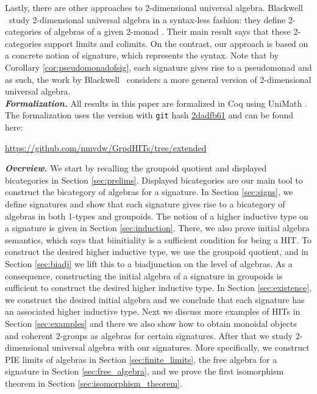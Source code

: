 Lastly, there are other approaches to 2-dimensional universal algebra.
Blackwell \etal \ study 2-dimensional universal algebra in a syntax-less fashion: they define 2-categories of algebras of a given 2-monad \cite{blackwell1989two}.
Their main result says that these 2-categories support limits and colimits.
On the contrast, our approach is based on a concrete notion of signature, which represents the syntax.
Note that by Corollary \ref{cor:pseudomonadofsig}, each signature gives rise to a pseudomonad and as such, the work by Blackwell \etal \ considers a more general version of 2-dimensional universal algebra.
\\
\emph{\textbf{Formalization.}}
All results in this paper are formalized in Coq \cite{Coq:manual} using UniMath \cite{UniMath}.
The formalization uses the version with \texttt{git} hash \href{https://github.com/UniMath/UniMath/tree/2dadfb61f5ef0d9805cf0eb6b80ef2beb26472d5}{2dadfb61} and can be found here:
\begin{center}
\url{https://github.com/nmvdw/GrpdHITs/tree/extended}
\end{center}
\emph{\textbf{Overview.}}
We start by recalling the groupoid quotient and displayed bicategories in Section \ref{sec:prelims}.
Displayed bicategories are our main tool to construct the bicategory of algebras for a signature.
In Section \ref{sec:signs}, we define signatures and show that each signature gives rise to a bicategory of algebras in both 1-types and groupoids.
The notion of a higher inductive type on a signature is given in Section \ref{sec:induction}.
There, we also prove initial algebra semantics, which says that biinitiality is a sufficient condition for being a HIT.
To construct the desired higher inductive type, we use the groupoid quotient, and in Section \ref{sec:biadj} we lift this to a biadjunction on the level of algebras.
As a consequence, constructing the initial algebra of a signature in groupoids is sufficient to construct the desired higher inductive type.
In Section \ref{sec:existence}, we construct the desired initial algebra and we conclude that each signature has an associated higher inductive type. 
Next we discuss more examples of HITs in Section \ref{sec:examples} and there we also show how to obtain monoidal objects and coherent 2-groups as algebras for certain signatures.
After that we study 2-dimensional universal algebra with our signatures.
More specifically, we construct PIE limits of algebras in Section \ref{sec:finite_limits}, the free algebra for a signature in Section \ref{sec:free_algebra}, and we prove the first isomorphism theorem in Section \ref{sec:isomorphism_theorem}.
